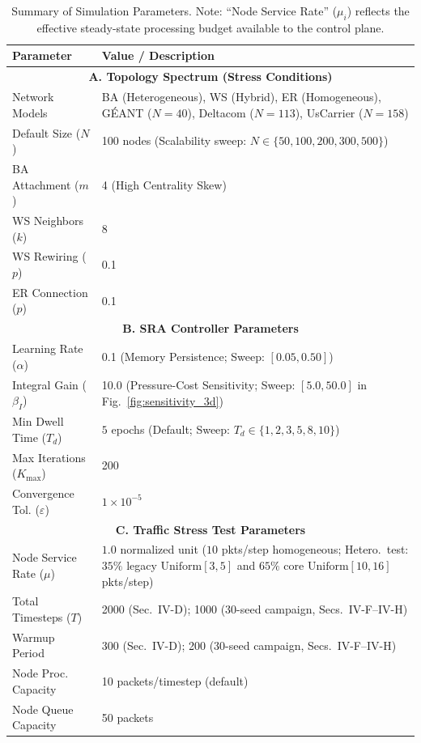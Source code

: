 \documentclass[journal]{IEEEtran}
\theoremstyle{plain}
\theoremstyle{definition}
\newcommand{\rev}[1]{{\color{blue}#1}}
\begin{document}
\begin{table}[t!]
\centering
\caption{Summary of Simulation Parameters. Note: ``Node Service Rate'' ($\mu_i$) reflects the effective steady-state processing budget available to the control plane.}
\label{tab:sim_params}
\renewcommand{\arraystretch}{1.2}
\small
\begin{tabularx}{\columnwidth}{|l|X|}
\hline
\textbf{Parameter} & \textbf{Value / Description} \\
\hline
\hline
\multicolumn{2}{|c|}{\textbf{A. Topology Spectrum (Stress Conditions)}} \\
\hline
Network Models & BA (Heterogeneous), WS (Hybrid), ER (Homogeneous)\rev{, G\'EANT ($N=40$), Deltacom ($N=113$), UsCarrier ($N=158$)} \\
\hline
Default Size ($N$) & 100 nodes \rev{(Scalability sweep: $N \in \{50, 100, 200, 300, 500\}$)} \\
\hline
BA Attachment ($m$) & 4 (High Centrality Skew) \\
\hline
WS Neighbors ($k$) & 8 \\
\hline
WS Rewiring ($p$) & 0.1 \\
\hline
ER Connection ($p$) & 0.1 \\
\hline
\hline
\multicolumn{2}{|c|}{\textbf{B. SRA Controller Parameters}} \\
\hline
Learning Rate ($\alpha$) & 0.1 (Memory Persistence; \rev{Sweep: $[0.05, 0.50]$}) \\
\hline
Integral Gain ($\beta_I$) & 10.0 (Pressure-Cost Sensitivity; \rev{Sweep: $[5.0, 50.0]$ in Fig.~\ref{fig:sensitivity_3d}}) \\
\hline
\rev{Min Dwell Time ($T_d$)} & \rev{$5$ epochs (Default; Sweep: $T_d \in \{1, 2, 3, 5, 8, 10\}$)} \\
\hline
Max Iterations ($K_{\max}$) & 200 \\
\hline
Convergence Tol. ($\varepsilon$) & $1 \times 10^{-5}$ \\
\hline
\hline
\multicolumn{2}{|c|}{\textbf{C. Traffic Stress Test Parameters}} \\
\hline
Node Service Rate ($\mu$) & $1.0$ normalized unit ($10$ pkts/step homogeneous; \rev{Hetero.\ test: $35\%$ legacy $\mathrm{Uniform}[3, 5]$ and $65\%$ core $\mathrm{Uniform}[10, 16]$ pkts/step}) \\
\hline
Total Timesteps ($T$) & 2000 (Sec.~IV-D); \rev{1000 (30-seed campaign, Secs.~IV-F--IV-H)} \\
\hline
Warmup Period & 300 (Sec.~IV-D); \rev{200 (30-seed campaign, Secs.~IV-F--IV-H)} \\
\hline
Node Proc. Capacity & 10 packets/timestep (default) \\
\hline
Node Queue Capacity & 50 packets \\
\hline
\end{tabularx}
\end{table}
\end{document}
